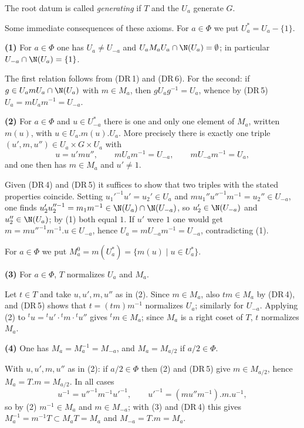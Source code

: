 \documentclass[12pt,a4paper,oneside,english]{smfart}
\makeatletter
\newcommand{\btanchor}[1]{\leavevmode\Hy@raisedlink{\hypertarget{bt:#1}{}}}
\theoremstyle{definition}
\theoremstyle{bt}
\makeatother
\begin{document}
\noindent The root datum is called \emph{generating} if $T$ and the $U_a$
generate $G$.

\btanchor{6.1.2} Some immediate consequences of these axioms. For $a\in\Phi$ we put
$U_a^{*}=U_a-\{1\}$.

\medskip
\noindent\textbf{(1)} For $a\in\Phi$ one has $U_a\ne U_{-a}$ and
$U_aM_aU_a\cap\N(U_a)=\emptyset$; in particular $U_{-a}\cap\N(U_a)=\{1\}$.

\begin{sketch}
The first relation follows from (DR\,1) and (DR\,6). For the second: if
$g\in U_amU_a\cap\N(U_a)$ with $m\in M_a$, then $gU_ag^{-1}=U_a$, whence by
(DR\,5) $U_a=mU_am^{-1}=U_{-a}$.
\end{sketch}

\noindent\textbf{(2)} For $a\in\Phi$ and $u\in U_{-a}^{*}$ there is one and only
one element of $M_a$, written $m(u)$, with $u\in U_a.m(u).U_a$. More precisely
there is exactly one triple $(u',m,u'')\in U_a\times G\times U_a$ with
\[ u=u'mu'',\qquad mU_am^{-1}=U_{-a},\qquad mU_{-a}m^{-1}=U_a, \]
and one then has $m\in M_a$ and $u'\ne 1$.

\begin{sketch}
Given (DR\,4) and (DR\,5) it suffices to show that two triples with the stated
properties coincide. Setting $u_1'^{-1}u'=u_2'\in U_a$ and
$mu_1''u''^{-1}m^{-1}=u_2''\in U_{-a}$, one finds
$u_2'u_2''^{-1}=m_1m^{-1}\in\N(U_a)\cap\N(U_{-a})$, so $u_2'\in\N(U_{-a})$ and
$u_2''\in\N(U_a)$; by (1) both equal $1$. If $u'$ were $1$ one would get
$m=mu''^{-1}m^{-1}.u\in U_{-a}$, hence $U_a=mU_{-a}m^{-1}=U_{-a}$, contradicting
(1).
\end{sketch}

\noindent For $a\in\Phi$ we put $M_a^{0}=m(U_a^{*})=\{m(u)\mid u\in U_a^{*}\}$.

\medskip
\noindent\textbf{(3)} For $a\in\Phi$, $T$ normalizes $U_a$ and $M_a$.

\begin{sketch}
Let $t\in T$ and take $u,u',m,u''$ as in (2). Since $m\in M_a$, also $tm\in M_a$
by (DR\,4), and (DR\,5) shows that $t=(tm)m^{-1}$ normalizes $U_a$; similarly
for $U_{-a}$. Applying (2) to
${}^{t}u={}^{t}u'\cdot{}^{t}m\cdot{}^{t}u''$ gives ${}^{t}m\in M_a$; since $M_a$
is a right coset of $T$, $t$ normalizes $M_a$.
\end{sketch}

\noindent\textbf{(4)} One has $M_a=M_a^{-1}=M_{-a}$, and $M_a=M_{a/2}$ if
$a/2\in\Phi$.

\begin{sketch}
With $u,u',m,u''$ as in (2): if $a/2\in\Phi$ then (2) and (DR\,5) give
$m\in M_{a/2}$, hence $M_a=T.m=M_{a/2}$. In all cases
\[ u^{-1}=u''^{-1}m^{-1}u'^{-1},\qquad u'^{-1}=(mu''m^{-1}).m.u^{-1}, \]
so by (2) $m^{-1}\in M_a$ and $m\in M_{-a}$; with (3) and (DR\,4) this gives
$M_a^{-1}=m^{-1}T\subset M_aT=M_a$ and $M_{-a}=T.m=M_a$.
\end{sketch}
\end{document}
